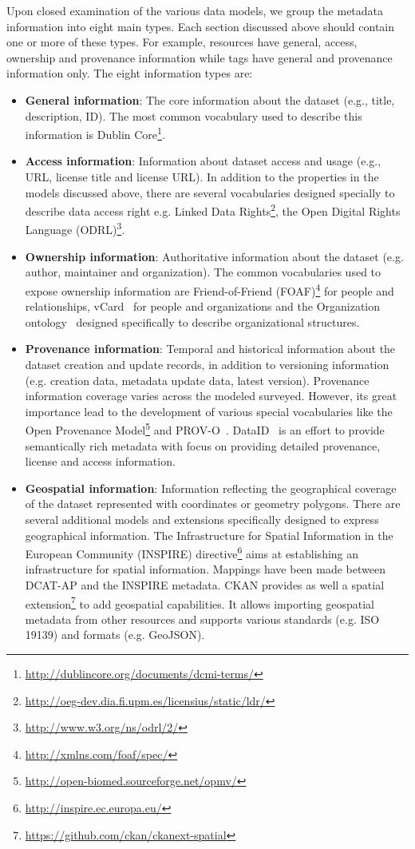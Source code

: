 \documentclass[runningheads,a4paper]{../../Tools/LaTEX/llncs}
\begin{document}
Upon closed examination of the various data models, we group the metadata information into eight main types. Each section discussed above should contain one or more of these types. For example, resources have general, access, ownership and provenance information while tags have general and provenance information only. The eight information types are:
\begin{itemize}
 \item \textbf{General information}: The core information about the dataset (e.g., title, description, ID). The most common vocabulary used to describe this information is Dublin Core\footnote{\url{http://dublincore.org/documents/dcmi-terms/}}.
 \item \textbf{Access information}: Information about dataset access and usage (e.g., URL, license title and license URL). In addition to the properties in the models discussed above, there are several vocabularies designed specially to describe data access right e.g. Linked Data Rights\footnote{\url{http://oeg-dev.dia.fi.upm.es/licensius/static/ldr/}}, the Open Digital Rights Language (ODRL)\footnote{\url{http://www.w3.org/ns/odrl/2/}}.
 \item \textbf{Ownership information}: Authoritative information about the dataset (e.g. author, maintainer and organization). The common vocabularies used to expose ownership information are Friend-of-Friend (FOAF)\footnote{\url{http://xmlns.com/foaf/spec/}} for people and relationships, vCard~\cite{Iannella:W3C:14} for people and organizations and the Organization ontology~\cite{Reynolds:W3C:14} designed specifically to describe organizational structures.
 \item \textbf{Provenance information}: Temporal and historical information about the dataset creation and update records, in addition to versioning information (e.g. creation data, metadata update data, latest version). Provenance information coverage varies across the modeled surveyed. However, its great importance lead to the development of various special vocabularies like the Open Provenance Model\footnote{\url{http://open-biomed.sourceforge.net/opmv/}} and PROV-O~\cite{Lebo:W3C:13}. DataID~\cite{Brummer::ICSS:14} is an effort to provide semantically rich metadata with focus on providing detailed provenance, license and access information.
 \item \textbf{Geospatial information}: Information reflecting the geographical coverage of the dataset represented with coordinates or geometry polygons. There are several additional models and extensions specifically designed to express geographical information. The Infrastructure for Spatial Information in the European Community (INSPIRE) directive\footnote{\url{http://inspire.ec.europa.eu/}} aims at establishing an infrastructure for spatial information. Mappings have been made between DCAT-AP and the INSPIRE metadata. CKAN provides as well a spatial extension\footnote{\url{https://github.com/ckan/ckanext-spatial}} to add geospatial capabilities. It allows importing geospatial metadata from other resources and supports various standards (e.g. ISO 19139) and formats (e.g. GeoJSON).

\end{itemize}
\end{document}
